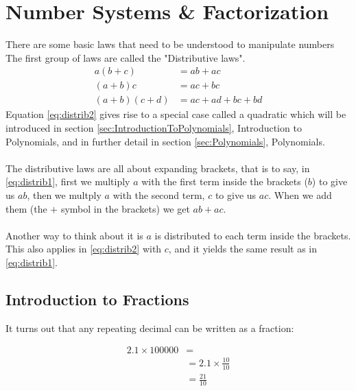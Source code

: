 \section{Number Systems \& Factorization}
\label{sec:NumberSystemsAndFactorization}
There are some basic laws that need to be understood to manipulate numbers
The first group of laws are called the "Distributive laws".
\begin{align}
      a(b+c) & = ab + ac \label{eq:distrib0} \\
      (a+b)c & = ac + bc \label{eq:distrib1} \\
  (a+b)(c+d) & = ac + ad + bc + bd \label{eq:distrib2}
\end{align}
Equation \ref{eq:distrib2} gives rise to a special case called a quadratic
which will be introduced in section \ref{sec:IntroductionToPolynomials},
Introduction to Polynomials, and in further detail in section
\ref{sec:Polynomials}, Polynomials.\\
\\
The distributive laws are all about expanding brackets, that is to say, in
\ref{eq:distrib1}, first we multiply $a$ with the first term inside the
brackets ($b$) to give us $ab$, then we multply $a$ with the second term, $c$
to give us $ac$. When we add them (the $+$ symbol in the brackets) we get
$ab + ac$.\\
\\
Another way to think about it is $a$ is distributed to each term inside the
brackets. This also applies in \ref{eq:distrib2} with $c$, and it yields the 
same result as in \ref{eq:distrib1}.

\newpage
\subsection{Introduction to Fractions}
\label{sec:IntroductionToFractions}
It turns out that any repeating decimal can be written as a fraction:

\begin{align}
  2.1 \times 100000 & = \\
    & = 2.1 \times \frac{10}{10} \\
    & = \frac{21}{10} \\
\end{align}

